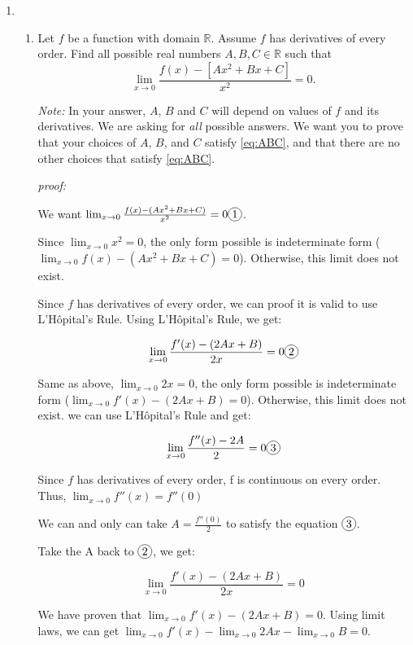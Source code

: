\documentclass[12pt]{exam}
\newcommand*\circled[1]{\tikz[baseline=(char.base)]{
    \node[shape=circle, draw, inner sep=1pt, 
        minimum height=12pt] (char) {#1};}}
\newcommand{\R}{\mathbb{R}}
\begin{document}
\begin{enumerate}
\newpage

\item  
	\begin{enumerate}
				
		\item  Let $f$ be a function with domain $\R$.  Assume $f$ has derivatives of every order.  Find all possible real numbers $A, B, C \in \R$ such that
			\begin{equation} \label{eq:ABC}
				\lim_{x \to 0} \frac{f(x) - \left[ Ax^2 + B x + C \right]}{x^2} = 0.
			\end{equation}	
			
			\emph{Note:} In your answer, $A$, $B$ and $C$ will depend on values of $f$ and its derivatives.  We are asking for \emph{all} possible answers.  We want you to prove that your choices of $A$, $B$, and $C$ satisfy \eqref{eq:ABC}, and that there are no other choices that satisfy \eqref{eq:ABC}.

			\emph{proof:}
			
			We want $\lim_{x \to 0} \frac{f(x) - (Ax^2 + Bx + C)}{x^2} = 0 \circled{1}$. 

			Since $\lim_{x \to 0} x^2 =0$, the only form possible is indeterminate form ($\lim_{x \to 0} f(x) - (Ax^2 + Bx + C) = 0$).
			Otherwise, this limit does not exist.

			Since $f$ has derivatives of every order, we can proof it is valid to use L'Hôpital's Rule. 
			Using L'Hôpital's Rule, we get:

			$$
				\lim_{x \to 0} \frac{f'(x) - (2Ax + B)}{2x} = 0 \circled{2}
			$$

			Same as above, $\lim_{x \to 0} 2x =0$, the only form possible is indeterminate form ($\lim_{x \to 0} f'(x) - (2Ax + B) = 0$).
			Otherwise, this limit does not exist. we can use L'Hôpital's Rule and get:

			$$
				\lim_{x \to 0} \frac{f''(x) - 2A}{2} = 0 \circled{3}
			$$

			Since $f$ has derivatives of every order, f is continuous on every order. 
			Thus, $\lim_{x \to 0} f''(x) = f''(0)$

			We can and only can take $A = \frac{f''(0)}{2}$ to satisfy the equation $\circled{3}$.

			Take the A back to $\circled{2}$, we get:

			$$
				\lim_{x \to 0} \frac{f'(x) - (2Ax + B)}{2x} = 0
			$$

			We have proven that $\lim_{x \to 0} f'(x) - (2Ax + B) = 0$. 
			Using limit laws, we can get $\lim_{x \to 0} f'(x) - \lim_{x \to 0} 2Ax - \lim_{x \to 0}B = 0$.


\end{enumerate}
\end{enumerate}
\end{document}
